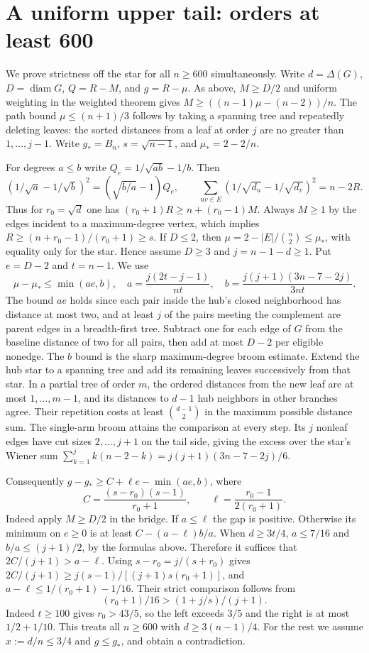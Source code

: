 \section{A uniform upper tail: orders at least 600}
We prove strictness off the star for all $n\ge600$ simultaneously.
Write $d=\Delta(G)$, $D=\operatorname{diam}G$, $Q=R-M$, and
$g=R-\mu$. As above, $M\ge D/2$ and uniform weighting in the
weighted theorem gives
$M\ge((n-1)\mu-(n-2))/n$. The path bound
$\mu\le(n+1)/3$ follows by taking a spanning tree and repeatedly
deleting leaves: the sorted distances from a leaf at order $j$
are no greater than $1,\ldots,j-1$. Write $g_*=B_n$, $s=\sqrt{n-1}$,
and $\mu_*=2-2/n$.

For degrees $a\le b$ write $Q_e=1/\sqrt{ab}-1/b$. Then
\[
 (1/\sqrt a-1/\sqrt b)^2=(\sqrt{b/a}-1)Q_e,\qquad
 \sum_{uv\in E}(1/\sqrt{d_u}-1/\sqrt{d_v})^2=n-2R.       \tag{1}
\]
Thus for $r_0=\sqrt d$ one has $(r_0+1)R\ge n+(r_0-1)M$. Always $M\ge1$ by the edges incident to a maximum-degree vertex, which implies $R\ge(n+r_0-1)/(r_0+1)\ge s$. If $D\le2$, then $\mu=2-|E|/\binom n2\le\mu_*$, with equality only for the star. Hence assume $D\ge3$ and $j=n-1-d\ge1$. Put $e=D-2$ and $t=n-1$. We use
\[
 \mu-\mu_*\le\min(ae,b),\quad
 a=\frac{j(2t-j-1)}{nt},\quad b=\frac{j(j+1)(3n-7-2j)}{3nt}.
\]
The bound $ae$ holds since each pair inside the hub's closed neighborhood has distance at most two, and at least $j$ of the pairs meeting the complement are parent edges in a breadth-first tree. Subtract one for each edge of $G$ from the baseline distance of two for all pairs, then add at most $D-2$ per eligible nonedge. The $b$ bound is the sharp maximum-degree broom estimate. Extend the hub star to a spanning tree and add its remaining leaves successively from that star. In a partial tree of order $m$, the ordered distances from the new leaf are at most $1,\ldots,m-1$, and its distances to $d-1$ hub neighbors in other branches agree. Their repetition costs at least $\binom{d-1}2$ in the maximum possible distance sum. The single-arm broom attains the comparison at every step. Its $j$ nonleaf edges have cut sizes $2,\ldots,j+1$ on the tail side, giving the excess over the star's Wiener sum $\sum_{k=1}^j k(n-2-k)=j(j+1)(3n-7-2j)/6$.

Consequently $g-g_*\ge C+\ell e-\min(ae,b)$, where
\[
 C=\frac{(s-r_0)(s-1)}{r_0+1},\qquad
 \ell=\frac{r_0-1}{2(r_0+1)} .
\]
Indeed apply $M\ge D/2$ in the bridge. If $a\le\ell$ the gap is positive. Otherwise its minimum on $e\ge0$ is at least $C-(a-\ell)b/a$. When $d\ge3t/4$, $a\le7/16$ and $b/a\le(j+1)/2$, by the formulas above. Therefore it suffices that $2C/(j+1)>a-\ell$. Using $s-r_0=j/(s+r_0)$ gives $2C/(j+1)\ge j(s-1)/[(j+1)s(r_0+1)]$, and $a-\ell\le 1/(r_0+1)-1/16$. Their strict comparison follows from
\[
 (r_0+1)/16>(1+j/s)/(j+1).
\]
Indeed $t\ge100$ gives $r_0>\!43/5$, so the left exceeds $3/5$ and the right is at most $1/2+1/10$. This treats all $n\ge600$ with $d\ge3(n-1)/4$. For the rest we assume $x:=d/n\le3/4$ and $g\le g_*$, and obtain a contradiction.

